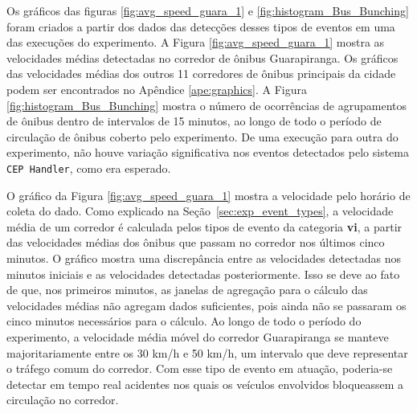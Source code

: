 Os gráficos das figuras \ref{fig:avg_speed_guara_1} e \ref{fig:histogram_Bus_Bunching} foram criados a partir dos dados das detecções desses tipos de eventos em uma das execuções do experimento. A Figura  \ref{fig:avg_speed_guara_1} mostra as velocidades médias detectadas no corredor de ônibus Guarapiranga. Os gráficos das velocidades médias dos outros 11 corredores de ônibus principais da cidade podem ser encontrados no Apêndice \ref{ape:graphics}. A Figura \ref{fig:histogram_Bus_Bunching} mostra o número de ocorrências de agrupamentos de ônibus dentro de intervalos de 15 minutos, ao longo de todo o período de circulação de ônibus coberto pelo experimento. De uma execução para outra do experimento, não houve variação significativa nos eventos detectados pelo sistema \texttt{CEP Handler}, como era esperado. 


O gráfico da Figura \ref{fig:avg_speed_guara_1} mostra a velocidade pelo horário de coleta do dado. 
Como explicado na Seção~\ref{sec:exp_event_types}, a velocidade média de um corredor é calculada pelos tipos de evento da categoria \textbf{vi}, a partir das velocidades médias dos ônibus que passam no corredor nos últimos cinco minutos.
O gráfico mostra uma discrepância entre as velocidades detectadas nos minutos iniciais e as velocidades detectadas posteriormente. Isso se deve ao fato de que, nos primeiros minutos, as janelas de agregação para o cálculo das velocidades médias não agregam dados suficientes,  pois ainda não se passaram os cinco minutos necessários para o cálculo. Ao longo de todo o período do experimento, a velocidade média móvel do corredor Guarapiranga se manteve majoritariamente entre os 30 km/h e 50 km/h, um intervalo que deve representar o tráfego comum do corredor. Com esse tipo de evento em atuação, poderia-se detectar em tempo real acidentes nos quais os veículos envolvidos bloqueassem a circulação no corredor.

